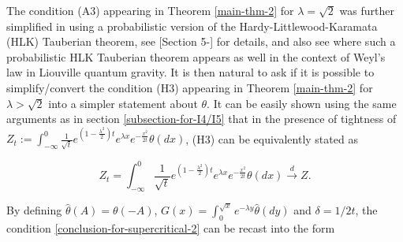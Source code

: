 \documentclass[a4paper,reqno]{amsart}%
\newcommand{\1}{\mathbf 1}
\theoremstyle{mine}
\numberwithin{theorem}{section}
\numberwithin{equation}{section}
\theoremstyle{remark}
\begin{document}
The condition (A3) appearing in Theorem \ref{main-thm-2} for $\lambda = \sqrt{2}$ was further simplified in \cite{Shekhar_Domain} using a probabilistic version of the Hardy-Littlewood-Karamata (HLK) Tauberian theorem, see [Section 5-\cite{Shekhar_Domain}] for details, and also see \cite{Berestycki-Wong-24-Weyl-Law} where such a probabilistic HLK Tauberian theorem appears as well in the context of Weyl's law in Liouville quantum gravity. It is then natural to ask if it is possible to simplify/convert the condition (H3) appearing in Theorem \ref{main-thm-2} for $\lambda >\sqrt{2}$ into a simpler statement about $\theta$. It can be easily shown using the same arguments as in section \ref{subsection-for-I4/I5} that in the presence of tightness of $Z_t := \int_{- \infty}^0 \frac{1}{\sqrt{t}}e^{(1-\frac{\lambda^2}{2})t}e^{\lambda x}e^{-\frac{x^2}{2t}}\theta(dx)$, (H3) can be equivalently stated as  

\begin{equation}\label{conclusion-for-supercritical-2}
   Z_t = \int_{-\infty}^{0} \frac{1}{\sqrt{t}}e^{(1-\frac{\lambda^2}{2})t}e^{\lambda x}e^{-\frac{x^2} {2t}}\theta(dx) \overset{d}{\to} Z.
    \end{equation}

By defining $\hat{\theta}(A) = \theta(-A)$, $G(x) = \int_0^{\sqrt{x}} e^{-\lambda y} \hat{\theta}(dy)$ and $\delta = 1/2t$, the condition \eqref{conclusion-for-supercritical-2} can be recast into the form  
\end{document}
